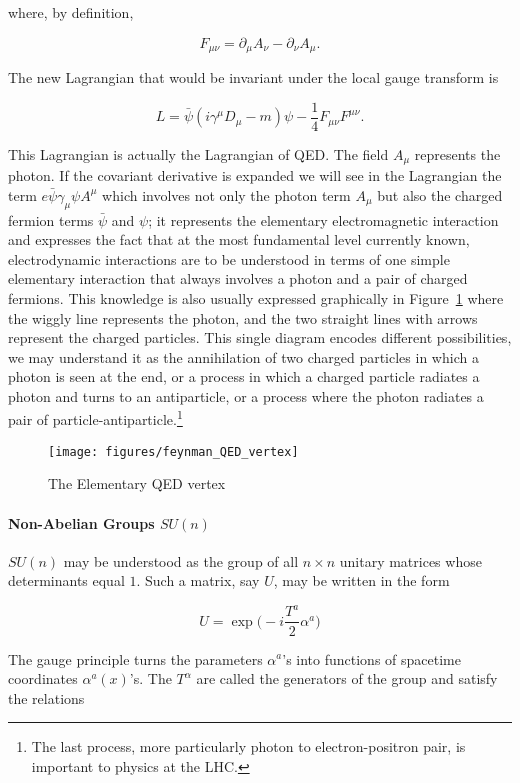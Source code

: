 where, by definition,

$$F_{\mu\nu} = \partial_{\mu}A_{\nu} - \partial_{\nu}A_{\mu}.$$

The new Lagrangian that would be invariant under the local gauge transform is

$$L = \bar{\psi}(i\gamma^{\mu}D_{\mu} - m)\psi -\frac{1}{4}F_{\mu\nu}F^{\mu\nu}.$$

This Lagrangian is actually the Lagrangian of QED. The field $A_{\mu}$
represents the photon. If the covariant derivative is expanded we will see in
the Lagrangian the term $e\bar{\psi}\gamma_{\mu}\psi A^{\mu}$ which involves
not only the photon term $A_{\mu}$ but also the charged fermion terms
$\bar{\psi}$ and $\psi$; it represents the elementary electromagnetic
interaction and expresses the fact that at the most fundamental level currently
known, electrodynamic interactions are to be understood in terms of one simple
elementary interaction that always involves a photon and a pair of charged
fermions. This knowledge is also usually expressed graphically in
Figure~\ref{f:smqedvertex} where the wiggly line represents the photon, and the
two straight lines with arrows represent the charged particles. This single
diagram encodes different possibilities, we may understand it as the
annihilation of two charged particles in which a photon is seen at the end, or
a process in which a charged particle radiates a photon and turns to an
antiparticle, or a process where the photon radiates a pair of
particle-antiparticle.\footnote{The last process, more particularly photon to
	electron-positron pair, is important to physics at the LHC.}


\begin{figure}[h]
	\texttt{[image: figures/feynman\_QED\_vertex]}
	\centering
	\caption{The Elementary QED vertex}
	\label{f:smqedvertex}
\end{figure}

\paragraph{Non-Abelian Groups $SU(n)$}

$SU(n)$ may be understood as the group of all $n\times n$ unitary matrices
whose determinants equal $1$. Such a matrix, say $U$, may be written in the
form

$$U = \exp\bigg(-i \frac{T^a}{2}\alpha^a \bigg) $$

The gauge principle turns the parameters $\alpha^a$'s into functions of
spacetime coordinates $\alpha^a(x)$'s. The $T^{\alpha}$ are called the
generators of the group and satisfy the relations

